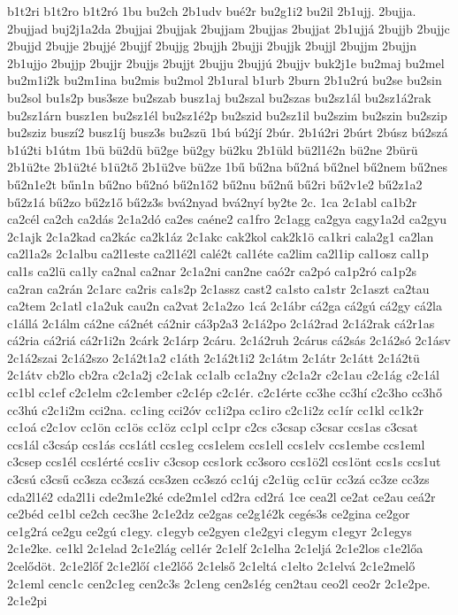 {b1t2ri
b1t2ro
b1t2ró
1bu
bu2ch
2b1udv
bué2r
bu2g1i2
bu2il
2b1ujj.
2bujja.
2bujjad
buj2j1a2da
2bujjai
2bujjak
2bujjam
2bujjas
2bujjat
2b1ujjá
2bujjb
2bujjc
2bujjd
2bujje
2bujjé
2bujjf
2bujjg
2bujjh
2bujji
2bujjk
2bujjl
2bujjm
2bujjn
2b1ujjo
2bujjp
2bujjr
2bujjs
2bujjt
2bujju
2bujjú
2bujjv
buk2j1e
bu2maj
bu2mel
bu2m1i2k
bu2m1ina
bu2mis
bu2mol
2b1ural
b1urb
2burn
2b1u2rú
bu2se
bu2sin
bu2sol
bu1s2p
bus3sze
bu2szab
busz1aj
bu2szal
bu2szas
bu2sz1ál
bu2sz1á2rak
bu2sz1árn
busz1en
bu2sz1él
bu2sz1é2p
bu2szid
bu2sz1il
bu2szim
bu2szin
bu2szip
bu2sziz
buszí2
busz1íj
busz3s
bu2szü
1bú
bú2jí
2búr.
2b1ú2ri
2búrt
2búsz
bú2szá
b1ú2ti
b1útm
1bü
bü2dü
bü2ge
bü2gy
bü2ku
2b1üld
bü2l1é2n
bü2ne
2bürü
2b1ü2te
2b1ü2té
b1ü2tő
2b1ü2ve
bü2ze
1bű
bű2na
bű2ná
bű2nel
bű2nem
bű2nes
bű2n1e2t
bűn1n
bű2no
bű2nó
bű2n1ő2
bű2nu
bű2nű
bű2ri
bű2v1e2
bű2z1a2
bű2z1á
bű2zo
bű2z1ő
bű2z3s
bvá2nyad
bvá2nyí
by2te
2c.
1ca
2c1abl
ca1b2r
ca2cél
ca2ch
ca2dás
2c1a2dó
ca2es
caéne2
ca1fro
2c1agg
ca2gya
cagy1a2d
ca2gyu
2c1ajk
2c1a2kad
ca2kác
ca2k1áz
2c1akc
cak2kol
cak2k1ö
ca1kri
cala2g1
ca2lan
ca2l1a2s
2c1albu
ca2l1este
ca2l1é2l
calé2t
cal1éte
ca2lim
ca2l1ip
cal1osz
cal1p
cal1s
ca2lü
ca1ly
ca2nal
ca2nar
2c1a2ni
can2ne
caó2r
ca2pó
ca1p2ró
ca1p2s
ca2ran
ca2rán
2c1arc
ca2ris
ca1s2p
2c1assz
cast2
ca1sto
ca1str
2c1aszt
ca2tau
ca2tem
2c1atl
c1a2uk
cau2n
ca2vat
2c1a2zo
1cá
2c1ábr
cá2ga
cá2gú
cá2gy
cá2la
c1állá
2c1álm
cá2ne
cá2nét
cá2nir
cá3p2a3
2c1á2po
2c1á2rad
2c1á2rak
cá2r1as
cá2ria
cá2riá
cá2r1i2n
2cárk
2c1árp
2cáru.
2c1á2ruh
2cárus
cá2sás
2c1á2só
2c1ásv
2c1á2szai
2c1á2szo
2c1á2t1a2
c1áth
2c1á2t1i2
2c1átm
2c1átr
2c1átt
2c1á2tü
2c1átv
cb2lo
cb2ra
c2c1a2j
c2c1ak
cc1alb
cc1a2ny
c2c1a2r
c2c1au
c2c1ág
c2c1ál
cc1bl
cc1ef
c2c1elm
c2c1ember
c2c1ép
c2c1ér.
c2c1érte
cc3he
cc3hí
c2c3ho
cc3hő
cc3hú
c2c1i2m
cci2na.
cc1ing
cci2óv
cc1i2pa
cc1iro
c2c1i2z
cc1ír
cc1kl
cc1k2r
cc1oá
c2c1ov
cc1ön
cc1ös
cc1öz
cc1pl
cc1pr
c2cs
c3csap
c3csar
ccs1as
c3csat
ccs1ál
c3csáp
ccs1ás
ccs1átl
ccs1eg
ccs1elem
ccs1ell
ccs1elv
ccs1embe
ccs1eml
c3csep
ccs1él
ccs1érté
ccs1iv
c3csop
ccs1ork
cc3soro
ccs1ö2l
ccs1önt
ccs1s
ccs1ut
c3csú
c3csű
cc3sza
cc3szá
ccs3zen
cc3szó
cc1új
c2c1üg
cc1ür
cc3zá
cc3ze
cc3zs
cda2l1é2
cda2l1i
cde2m1e2ké
cde2m1el
cd2ra
cd2rá
1ce
cea2l
ce2at
ce2au
ceá2r
ce2béd
ce1bl
ce2ch
cec3he
2c1e2dz
ce2gas
ce2g1é2k
cegés3s
ce2gina
ce2gor
ce1g2rá
ce2gu
ce2gú
c1egy.
c1egyb
ce2gyen
c1e2gyi
c1egym
c1egyr
2c1egys
2c1e2ke.
ce1kl
2c1elad
2c1e2lág
cel1ér
2c1elf
2c1elha
2c1eljá
2c1e2los
c1e2lőa
2celődöt.
2c1e2lőf
2c1e2lőí
c1e2lőő
2c1első
2c1eltá
c1elto
2c1elvá
2c1e2melő
2c1eml
cenc1c
cen2c1eg
cen2c3s
2c1eng
cen2s1ég
cen2tau
ceo2l
ceo2r
2c1e2pe.
2c1e2pi
}
